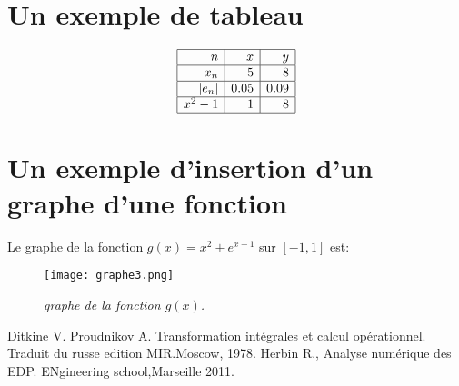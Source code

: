\documentclass[a4paper,12pt]{article}
\begin{document}
\section{Un exemple de tableau}
$$\begin{array}{|r|r|r|}
\hline n & x & y\\
\hline x_n & 5 & 8\\
\hline |e_n| & 0.05 &0.09\\
\hline x^2-1 & 1 & 8 \\
\hline
\end{array}$$ 
\section{Un exemple d'insertion d'un graphe d'une fonction}
Le graphe de la fonction $ g(x)=x^2+e^{x-1} $ sur $\left[ -1,1\right]$ est:
\begin{figure}[htbp]
\centering
\texttt{[image: graphe3.png]}
\caption {\textit{graphe de la fonction $g(x)$.}}
\end{figure}
\begin{thebibliography}{}
 Ditkine V. Proudnikov A. Transformation intégrales et calcul opérationnel. Traduit du russe edition MIR.Moscow, 1978.
 Herbin R., Analyse numérique des EDP. ENgineering school,Marseille 2011.
\end{thebibliography}{}
\end{document}

